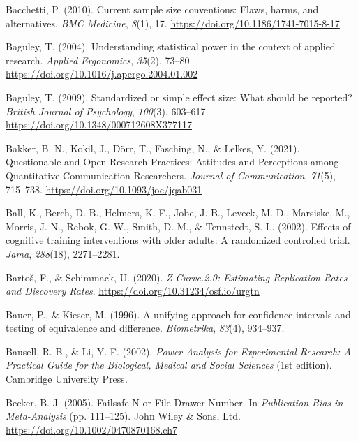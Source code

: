 \documentclass[
  letterpaper,
  DIV=11,
  numbers=noendperiod]{scrreprt}
\newlength{\cslhangindent}
\newlength{\cslentryspacingunit} %
\newenvironment{CSLReferences}[2] %
 {%
  \setlength{\parindent}{0pt}
  \ifodd #1
  \let\oldpar\par
  \def\par{\hangindent=\cslhangindent\oldpar}
  \fi
  \setlength{\parskip}{#2\cslentryspacingunit}
 }%
 {}
\begin{document}
\begin{CSLReferences}{1}{0}
\leavevmode{}%
Bacchetti, P. (2010). Current sample size conventions: {Flaws}, harms,
and alternatives. \emph{BMC Medicine}, \emph{8}(1), 17.
\url{https://doi.org/10.1186/1741-7015-8-17}

\leavevmode{}%
Baguley, T. (2004). Understanding statistical power in the context of
applied research. \emph{Applied Ergonomics}, \emph{35}(2), 73--80.
\url{https://doi.org/10.1016/j.apergo.2004.01.002}

\leavevmode{}%
Baguley, T. (2009). Standardized or simple effect size: {What} should be
reported? \emph{British Journal of Psychology}, \emph{100}(3), 603--617.
\url{https://doi.org/10.1348/000712608X377117}

\leavevmode{}%
Bakker, B. N., Kokil, J., Dörr, T., Fasching, N., \& Lelkes, Y. (2021).
Questionable and {Open Research Practices}: {Attitudes} and
{Perceptions} among {Quantitative Communication Researchers}.
\emph{Journal of Communication}, \emph{71}(5), 715--738.
\url{https://doi.org/10.1093/joc/jqab031}

\leavevmode{}%
Ball, K., Berch, D. B., Helmers, K. F., Jobe, J. B., Leveck, M. D.,
Marsiske, M., Morris, J. N., Rebok, G. W., Smith, D. M., \& Tennstedt,
S. L. (2002). Effects of cognitive training interventions with older
adults: A randomized controlled trial. \emph{Jama}, \emph{288}(18),
2271--2281.

\leavevmode{}%
Bartoš, F., \& Schimmack, U. (2020). \emph{Z-{Curve}.2.0: {Estimating
Replication Rates} and {Discovery Rates}}.
\url{https://doi.org/10.31234/osf.io/urgtn}

\leavevmode{}%
Bauer, P., \& Kieser, M. (1996). A unifying approach for confidence
intervals and testing of equivalence and difference. \emph{Biometrika},
\emph{83}(4), 934--937.

\leavevmode{}%
Bausell, R. B., \& Li, Y.-F. (2002). \emph{Power {Analysis} for
{Experimental Research}: {A Practical Guide} for the {Biological},
{Medical} and {Social Sciences}} (1st edition). {Cambridge University
Press}.

\leavevmode{}%
Becker, B. J. (2005). Failsafe {N} or {File-Drawer Number}. In
\emph{Publication {Bias} in {Meta-Analysis}} (pp. 111--125). {John Wiley
\& Sons, Ltd}. \url{https://doi.org/10.1002/0470870168.ch7}


\end{CSLReferences}
\end{document}
